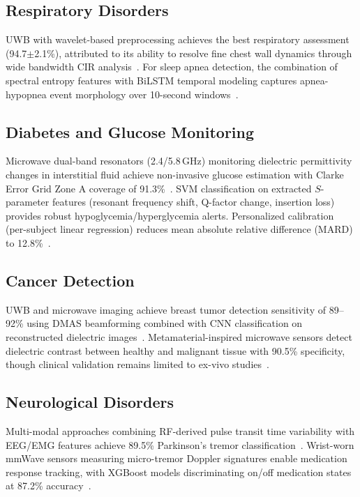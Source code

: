 \documentclass[journal,twoside]{IEEEtran}
\begin{document}
\subsection{Respiratory Disorders}
UWB with wavelet-based preprocessing achieves the best respiratory assessment (94.7$\pm$2.1\%), attributed to its ability to resolve fine chest wall dynamics through wide bandwidth CIR analysis~\cite{ref_uwb_overview2024}. For sleep apnea detection, the combination of spectral entropy features with BiLSTM temporal modeling captures apnea-hypopnea event morphology over 10-second windows~\cite{ref_infant_monitor2025}.

\subsection{Diabetes and Glucose Monitoring}
Microwave dual-band resonators (2.4/5.8\,GHz) monitoring dielectric permittivity changes in interstitial fluid achieve non-invasive glucose estimation with Clarke Error Grid Zone A coverage of 91.3\%~\cite{ref_noninvasive_glucose2025}. SVM classification on extracted $S$-parameter features (resonant frequency shift, Q-factor change, insertion loss) provides robust hypoglycemia/hyperglycemia alerts. Personalized calibration (per-subject linear regression) reduces mean absolute relative difference (MARD) to 12.8\%~\cite{ref_noninvasive_glucose2025}.

\subsection{Cancer Detection}
UWB and microwave imaging achieve breast tumor detection sensitivity of 89--92\% using DMAS beamforming combined with CNN classification on reconstructed dielectric images~\cite{ref_uwb_breast2024}. Metamaterial-inspired microwave sensors detect dielectric contrast between healthy and malignant tissue with 90.5\% specificity, though clinical validation remains limited to ex-vivo studies~\cite{ref_metamaterial_cancer2024}.

\subsection{Neurological Disorders}
Multi-modal approaches combining RF-derived pulse transit time variability with EEG/EMG features achieve 89.5\% Parkinson's tremor classification~\cite{ref_parkinson_review2025}. Wrist-worn mmWave sensors measuring micro-tremor Doppler signatures enable medication response tracking, with XGBoost models discriminating on/off medication states at 87.2\% accuracy~\cite{ref_parkinson_wearable2023}.
\end{document}
